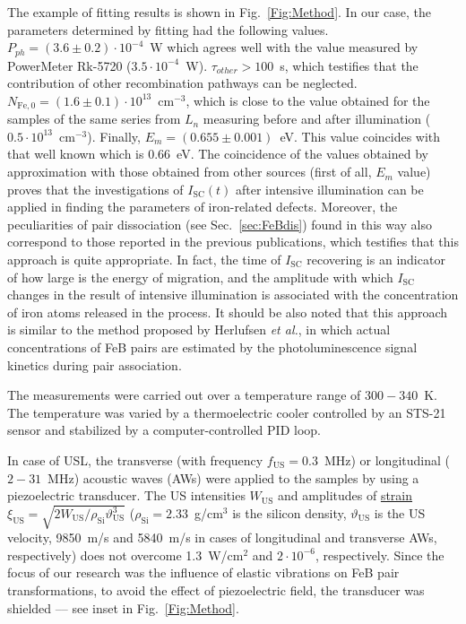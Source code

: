 \documentclass[%
 aip,jap,
 amsmath,amssymb,
 reprint,%
]{revtex4-1}
\begin{document}
The example of fitting results is shown in Fig.~\ref{Fig:Method}.
In our case, the parameters determined by fitting had the following values.
$P_{ph} = (3.6\pm0.2)\cdot10^{-4}$~W which agrees well
with the value measured by PowerMeter Rk-5720 ($3.5\cdot10^{-4}$~W).
$\tau_{other}>100$~s, which testifies that the contribution of other recombination pathways can be neglected.
$N_\mathrm{Fe,0}=(1.6\pm0.1)\cdot10^{13}$~cm$^{-3}$,
which is close to the value obtained for the samples of the same series from $L_n$ measuring before and after illumination ($0.5\cdot10^{13}$~cm$^{-3}$).
Finally, $E_m = (0.655\pm0.001)$~eV.
This value coincides with that well known \cite{FeBAssJAP2014,FeBkinAPL2008,FeBKin2019,FeBAssSST2011} which is $0.66$~eV.
The coincidence of the values obtained by approximation
with those obtained from other sources (first of all, $E_m$ value) proves
that the investigations of $I_\mathrm{SC}(t)$ after intensive illumination can be applied in finding the parameters of iron-related defects.
Moreover, the peculiarities of pair dissociation (see Sec.~\ref{sec:FeBdis}) found in this way also correspond to those reported in the previous publications, which testifies that this approach is quite appropriate.
In fact, the time of $I_\mathrm{SC}$ recovering is an indicator of how large is the energy of migration,
and the amplitude with which $I_\mathrm{SC}$ changes in the result of intensive illumination is associated with the concentration of iron atoms released in the process.
It should be also noted that this approach is similar to the method proposed
by Herlufsen \emph{et al.}\cite{FeMethod2012}, in which actual concentrations of FeB pairs are estimated by the photoluminescence signal kinetics during pair association.

The measurements were carried out over a temperature range of $300-340$~K.
The temperature was varied by a thermoelectric cooler controlled by an STS-21 sensor and stabilized by a computer-controlled PID loop.

In case of USL, the transverse (with frequency $f_\mathrm{US}=0.3$~MHz) or
longitudinal ($2-31$~MHz) acoustic waves (AWs) were applied to the samples by using a piezoelectric transducer.
The US intensities $W_\mathrm{US}$ and amplitudes of \textcolor[rgb]{0.00,0.07,1.00}{\uline{strain}}
$\xi_\mathrm{US}=\sqrt{2W_\mathrm{US}/\rho_\mathrm{Si}\vartheta_\mathrm{US}^3}$
($\rho_\mathrm{Si}=2.33$~g/cm$^3$ is the silicon density,
$\vartheta_\mathrm{US}$ is the US velocity, 9850~m/s and 5840~m/s in cases of longitudinal and transverse AWs, respectively)
does not overcome 1.3~W/cm$^2$ and $2\cdot10^{-6}$, respectively.
Since the focus of our research was the influence of elastic vibrations on  FeB pair transformations,   to avoid the effect of piezoelectric field, the transducer was shielded --– see inset in Fig.~\ref{Fig:Method}.
\end{document}
